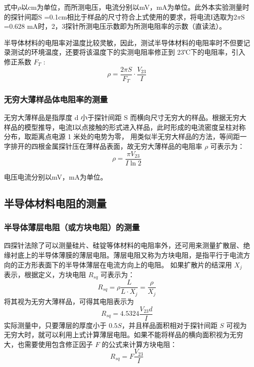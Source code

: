 \documentclass[a4paper,utf8]{article}
\begin{document}
            式中$\rho $以cm为单位，而所测电压，电流分别以mV，mA为单位。此外本实验测量时的探针间距S =0.1cm相比于样品的尺寸符合上式使用的要求，将电流I选取为2$ \pi $S =0.628 mA时，2，3探针所测电压示数即为所测电阻率的示数（直读法）。
            
            半导体材料的电阻率对温度比较灵敏，因此，测试半导体材料的电阻率时不但要记录测试的环境温度，还要将该温度下的实测电阻率修正到 23℃下的电阻率，引入修正系数 $F_T$ : 
            \begin{equation*}
                \rho =\frac{2\pi S}{F_T}\cdot\frac{V_{23}}{I}
            \end{equation*}
        \subsubsection{无穷大薄样品体电阻率的测量}
        无穷大薄样品是指厚度 d 小于探针间距 S 而横向尺寸无穷大的样品。根据无穷大样品的模型推导，电流I以点接触的形式进入样品，此时形成的电流密度呈柱对称分布，取距离点电源 1 米处的电势为零，
        用类似半无穷大样品的方法，等间距一字排开的四根金属探针压在薄样品表面，故无穷大薄样品的电阻率 $\rho$ 可表示为：
            \begin{equation*}
                \rho =\frac{\pi V_{23}}{I \ln 2} \label{eq:1}
            \end{equation*}

        电压电流分别以mV，mA为单位。
    \subsection{半导体材料电阻的测量}        
        \subsubsection{半导体薄层电阻（或方块电阻）的测量}
        四探针法除了可以测量硅片、硅锭等体材料的电阻率外，还可用来测量扩散层、绝缘衬底上的半导体薄膜的薄层电阻。薄层电阻又称为方块电阻，是指平行于电流方向的正方形表面下的半导体薄层在电流方向上的电阻。
        如果扩散片的结深用 $X_j$ 表示，根据定义，方块电阻 $R_{sq}$ 可表示为：
            \begin{equation*}
                R_{sq}=\rho\frac{L}{L\cdot X_{j}}=\frac{\rho}{X_{j}} \label{eq:2}
            \end{equation*}
            将其视为无穷大薄样品，可得其电阻表示为
            \begin{equation*}
                R_{sq}=4.5324\frac{V_{23} d}{I} \label{eq:3}
            \end{equation*}
            实际测量中，只要薄层的厚度小于 $0.5S$，并且样品面积相对于探针间距 $S$ 可视为无穷大时，就可以利用上式计算薄层电阻。如果不能将样品的横向面积视为无穷大，也需要使用包含修正因子 $F$ 的公式来计算方块电阻：
            \begin{equation*}
                R_{sq}= F \frac{V_{23}}{I} \label{eq:4}
            \end{equation*}
\end{document}
